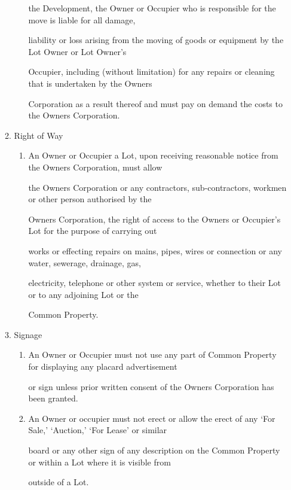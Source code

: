 \documentclass{article}
\begin{document}
\begin{enumerate}[label=\arabic*.]
\begin{enumerate}[label=\arabic{enumi}.\arabic*.]
\begin{enumerate}[label=(\arabic*)]
the Development, the Owner or Occupier who is responsible for the move is liable for all damage, 

liability or loss arising from the moving of goods or equipment by the Lot Owner or Lot Owner’s 

Occupier, including (without limitation) for any repairs or cleaning that is undertaken by the Owners 

Corporation as a result thereof and must pay on demand the costs to the Owners Corporation. 

\newpage

\end{enumerate}
\item  Right of Way 

\begin{enumerate}[label=(\arabic*)]
\item  An Owner or Occupier a Lot, upon receiving reasonable notice from the Owners Corporation, must allow 

the Owners Corporation or any contractors, sub-contractors, workmen or other person authorised by the 

Owners Corporation, the right of access to the Owners or Occupier’s Lot for the purpose of carrying out 

works or effecting repairs on mains, pipes, wires or connection or any water, sewerage, drainage, gas, 

electricity, telephone or other system or service, whether to their Lot or to any adjoining Lot or the 

Common Property. 

\end{enumerate}
\item  Signage 

\begin{enumerate}[label=(\arabic*)]
\item  An Owner or Occupier must not use any part of Common Property for displaying any placard advertisement 

or sign unless prior written consent of the Owners Corporation has been granted. 

\item  An Owner or occupier must not erect or allow the erect of any ‘For Sale,’ ‘Auction,’ ‘For Lease’ or similar 

board or any other sign of any description on the Common Property or within a Lot where it is visible from 

outside of a Lot. 


\end{enumerate}
\end{enumerate}
\end{enumerate}
\end{document}
